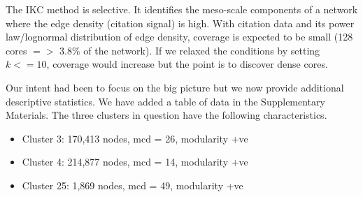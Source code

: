 \documentclass[11pt, oneside]{article}   	%
\begin{document}
The IKC method is selective. It identifies the meso-scale components of a network where the edge density (citation signal) is high. With citation data and its power law/lognormal distribution of edge density, coverage is expected to be small (128 cores $=>$ 3.8\% of the network). If we relaxed the conditions by setting $k<= 10$, coverage would increase but the point is to discover dense cores.

Our intent had been to focus on the big picture but we now provide additional descriptive statistics. We have added a table of data in the Supplementary Materials. The three clusters in question have the following characteristics. 



\begin{itemize}
\item Cluster 3: 170,413 nodes, mcd = 26, modularity +ve
\item Cluster 4: 214,877 nodes, mcd = 14, modularity +ve
\item Cluster 25: 1,869 nodes, mcd = 49, modularity +ve
\end{itemize}
\end{document}

